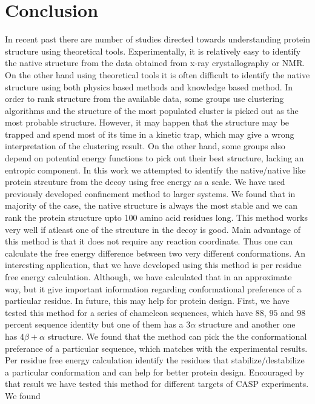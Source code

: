 \documentclass[12pt]{article}
\begin{document}
\section{Conclusion}


In recent past there are number of studies directed towards understanding protein 
structure using theoretical tools. Experimentally, it is relatively easy to identify the native structure from the data obtained 
from x-ray crystallography or NMR. On the other hand using theoretical tools it is often difficult to identify the native structure 
using both physics based methods and knowledge based method. In order to rank structure from the available data, some groups use 
clustering algorithms and the structure of the
most populated cluster is picked out as the most probable structure. However, it may happen that the structure may be trapped and 
spend most of its time in a kinetic trap, which may give a wrong interpretation of the clustering result. On the other hand, some groups
also depend on potential energy functions to pick out their best structure, lacking an entropic
component. In this work we attempted to identify the native/native like protein strcuture from the decoy using free energy as a scale.
We have used previously developed confinement method to larger systems.
We found that in majority of the case, the native structure is always the most stable and we can rank the protein structure upto 100 amino 
acid residues long. This method works very well if atleast one of the strcuture in the decoy is good. Main advantage of this method is 
that it does not require any reaction coordinate. Thus one can calculate the free energy difference between two very different conformations. 
An interesting application, that we have developed using this method is per residue
free energy calculation. Although, we have calculated that in an approximate way, but it give important information regarding conformational 
preference of a particular residue. In future, this may help for protein design. 
First, we have tested this method for a series of chameleon sequences, which have $88$, $95$ and $98$ percent sequence identity
but one of them has a $3 \alpha$ structure and another one has $4 \beta + \alpha$ structure. We found that the method can pick the 
the conformational preferance of a particular sequence, which matches with the experimental results. Per residue free energy calculation 
identify the residues that stabilize/destabilize a particular conformation and can help for better protein design. 
Encouraged by that result we have tested this method for different targets of CASP experiments. We found 
\end{document}

